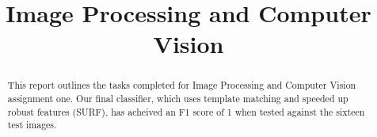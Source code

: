 \documentclass[conference]{IEEEtran}
\begin{document}
\title{Image Processing and Computer Vision\\
}
\author{
\and
{}
}


\maketitle

\begin{abstract}
This report outlines the tasks completed for Image Processing and Computer Vision assignment one. Our final classifier, which uses template matching and speeded up robust features (SURF), has acheived an F1 score of 1 when tested against the sixteen test images. 
\end{abstract}

\end{document}
